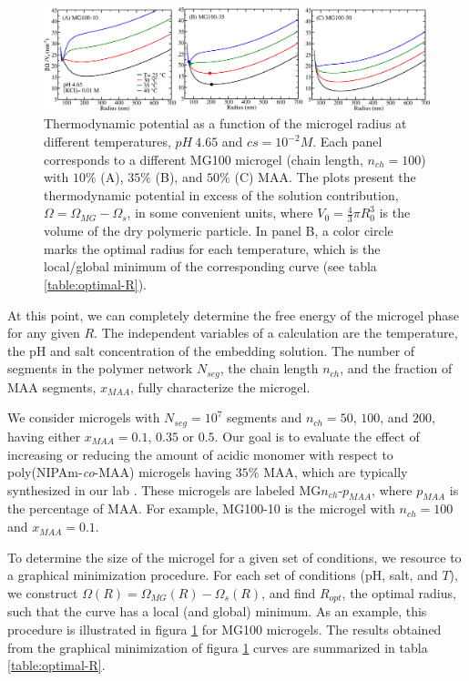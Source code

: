 \begin{figure}[!htb]
\centering
\includegraphics[width=1.\linewidth]{Figures/graph-gel/graph-min.png}
\caption{Thermodynamic potential as a function of the microgel radius at different temperatures, $pH~4.65$ and $cs=10^{-2}M$.
Each panel corresponds to a different MG100 microgel (chain length, $n_{ch}=100$) with $10\%$ (A), $35\%$ (B), and $50\%$ (C) MAA.
The plots present the thermodynamic potential in excess of the solution contribution, $\Omega=\Omega_{MG}-\Omega_s$, in some convenient units, where $V_0=\frac{4}{3}\pi R_0^3$ is the volume of the dry polymeric particle.
In panel B, a color circle marks the optimal radius for each temperature, which is the local/global minimum of the corresponding curve (see tabla \ref{table:optimal-R}).}
\label{fig:graph-min}
\end{figure}


At this point, we can completely determine the free energy of the microgel phase for any given $R$.
The independent variables of a calculation are the temperature, the pH and salt concentration of the embedding solution.
The number of segments in the polymer network $N_{seg}$, the chain length $n_{ch}$, and the fraction of MAA segments, $x_{MAA}$, fully characterize the microgel.


We consider microgels with $N_{seg}=10^7$ segments and $n_{ch}=50$, $100$, and $200$, having either $x_{MAA}=0.1$, $0.35$ or $0.5$.
Our goal is to evaluate the effect of increasing or reducing the amount of acidic monomer with respect to poly(NIPAm-\emph{co}-MAA) microgels having $35\%$ MAA, which are typically synthesized in our lab .
These microgels are labeled MG$n_{ch}$-$p_{MAA}$, where $p_{MAA}$ is the percentage of MAA.
For example, MG100-10 is the microgel with  $n_{ch}=100$ and $x_{MAA}=0.1$.






To determine the size of the microgel for a given set of conditions, we resource to a graphical minimization procedure.
For each set of conditions (pH, salt, and $T$), we construct $\Omega(R)=\Omega_{MG}(R)-\Omega_{s}(R)$, and find $R_{opt}$, the optimal radius, such that the curve has a local (and global) minimum.
As an example, this procedure is illustrated in figura \ref{fig:graph-min} for MG100 microgels.
The results obtained from the graphical minimization of figura \ref{fig:graph-min} curves are summarized in tabla \ref{table:optimal-R}.



